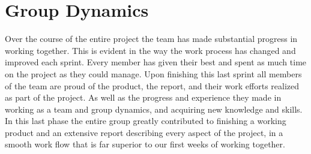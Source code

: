 \section{Group Dynamics}
\label{sec:FinalDynamics}
Over the course of the entire project the team has made substantial progress in working together. This is evident in the way the work process has changed and improved each sprint. Every member has given their best and spent as much time on the project as they could manage. Upon finishing this last sprint all members of the team are proud of the product, the report, and their work efforts realized as part of the project. As well as the progress and experience they made in working as a team and group dynamics, and acquiring new knowledge and skills. In this last phase the entire group greatly contributed to finishing a working product and an extensive report describing every aspect of the project, in a smooth work flow that is far superior to our first weeks of working together. 
